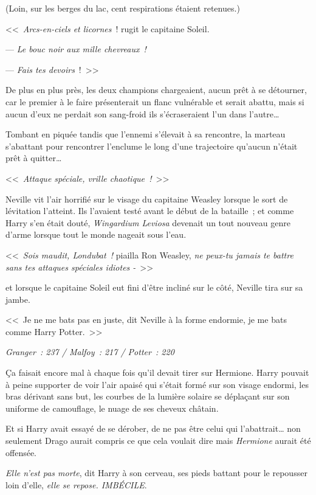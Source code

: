(Loin, sur les berges du lac, cent respirations étaient retenues.)

<<~\emph{Arcs-en-ciels et licornes}~! rugit le capitaine Soleil.

--- \emph{Le bouc noir aux mille chevreaux~!}

--- \emph{Fais tes devoirs}~!~>>

De plus en plus près, les deux champions chargeaient, aucun prêt à se détourner, car le premier à le faire présenterait un flanc vulnérable et serait abattu, mais si aucun d'eux ne perdait son sang-froid ils s'écraseraient l'un dans l'autre…

Tombant en piquée tandis que l'ennemi s'élevait à sa rencontre, la marteau s'abattant pour rencontrer l'enclume le long d'une trajectoire qu'aucun n'était prêt à quitter…

<<~\emph{Attaque spéciale, vrille chaotique~!}~>>

Neville vit l'air horrifié sur le visage du capitaine Weasley lorsque le sort de lévitation l'atteint. Ils l'avaient testé avant le début de la bataille~; et comme Harry s'en était douté, \emph{Wingardium Leviosa} devenait un tout nouveau genre d'arme lorsque tout le monde nageait sous l'eau.

<<~\emph{Sois maudit, Londubat~!} piailla Ron Weasley, \emph{ne peux-tu jamais te battre sans tes attaques spéciales idiotes -}~>>

et lorsque le capitaine Soleil eut fini d'être incliné sur le côté, Neville tira sur sa jambe.

<<~Je ne me bats pas en juste, dit Neville à la forme endormie, je me bats comme Harry Potter.~>>

\emph{Granger~: 237 / Malfoy~: 217 / Potter~: 220}

\later

Ça faisait encore mal à chaque fois qu'il devait tirer sur Hermione. Harry pouvait à peine supporter de voir l'air apaisé qui s'était formé sur son visage endormi, les bras dérivant sans but, les courbes de la lumière solaire se déplaçant sur son uniforme de camouflage, le nuage de ses cheveux châtain.

Et si Harry avait essayé de se dérober, de ne pas être celui qui l'abattrait… non seulement Drago aurait compris ce que cela voulait dire mais \emph{Hermione} aurait été offensée.

\emph{Elle n'est pas morte}, dit Harry à son cerveau, ses pieds battant pour le repousser loin d'elle, \emph{elle se repose. IMBÉCILE}.

